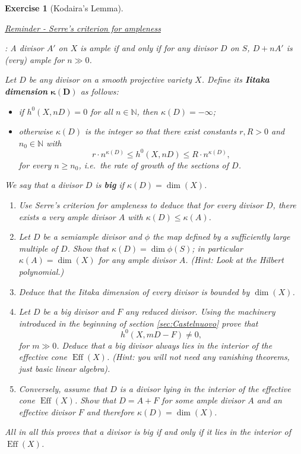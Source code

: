 \documentclass[a4paper,11pt]{amsart}
\newtheorem{exercise}[theorem]{Exercise}
\def\dim{\operatorname{dim}}
\def\Eff{\operatorname{Eff}}
\newcommand{\NN}{\mathbb{N}}
\begin{document}
\begin{exercise}[{Kodaira's Lemma}]\label{exer:KodairaLemma}\leavevmode
	\begin{center}
	\begin{minipage}{.9\textwidth}
		\hypertarget{rem:SerreAmpleness}{\underline{Reminder - \emph{Serre's criterion for ampleness}}}:
		A divisor $A'$ on $X$ is ample if and only if for any divisor $D$ on $S$, $D + nA'$ is (very) ample for $n\gg 0$.
	\end{minipage}
	\end{center}
	
	Let $D$ be any divisor on a smooth projective variety $X$.
	Define its \textbf{Iitaka dimension} $\boldsymbol{\kappa(D)}$ as follows:
	\begin{itemize}
		\item if $h^0(X,nD) = 0$ for all $n \in \NN$, then ${\kappa(D) = -\infty}$;
		\item otherwise $\kappa(D)$ is the integer so that there exist constants $r, R > 0$ and $n_0 \in \NN$ with
		\[
		r\cdot n^{\kappa(D)} \leq h^0(X,nD) \leq R\cdot n^{\kappa(D)},
		\]
		for every $n \geq n_0$, i.e.\ the \emph{rate of growth} of the sections of $D$.
	\end{itemize}
	We say that a divisor $D$ is \textbf{big} if $\kappa(D) = \dim(X)$.
	
	\begin{enumerate}
		\item\label{itExer:KodLemma1} Use Serre's criterion for ampleness to deduce that for every divisor $D$, there exists a very ample divisor $A$ with $\kappa(D) \leq \kappa(A)$.
		\item Let $D$ be a semiample divisor and $\phi$ the map defined by a sufficiently large multiple of $D$.
		Show that $\kappa(D) = \dim\phi(S)$;
		in particular $\kappa(A) = \dim(X)$ for any ample divisor $A$.
		{\small(Hint: Look at the Hilbert polynomial.)}
		\item Deduce that the Iitaka dimension of every divisor is bounded by $\dim(X)$.		
		\item Let $D$ be a big divisor and $F$ any reduced divisor.
		Using the machinery introduced in the beginning of section \ref{sec:Castelnuovo} prove that
		\[
		h^0(X,mD-F) \neq 0,
		\] 
		for $m \gg 0$.
		Deduce that a big divisor always lies in the interior of the effective cone $\Eff(X)$.
		{\small(Hint: you will not need any vanishing theorems, just basic linear algebra)}.	
		\item Conversely, assume that $D$ is a divisor lying in the interior of the effective cone $\Eff(X)$.
		Show that $D = A + F$ for some ample divisor $A$ and an effective divisor $F$ and therefore $\kappa(D) = \dim(X)$.
	\end{enumerate}
	All in all this proves that a divisor is big if and only if it lies in the interior of $\Eff(X)$.
\end{exercise}
\end{document}
